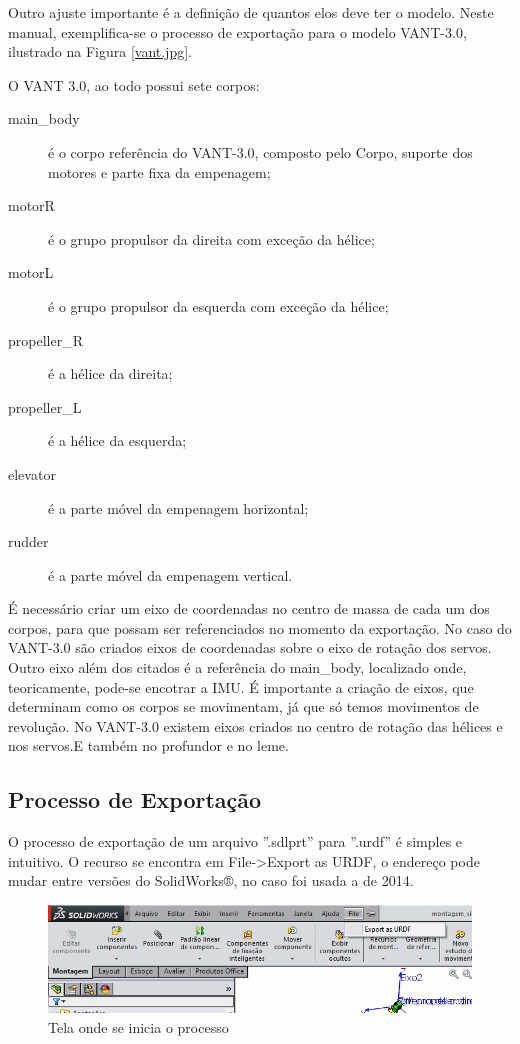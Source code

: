Outro ajuste importante é a definição de quantos elos deve ter o modelo. Neste manual, exemplifica-se o processo de exportação para o modelo VANT-3.0, ilustrado na Figura \ref{vant.jpg}.

O VANT 3.0, ao todo possui sete corpos:


\begin{description}
\item [main\_body] é o corpo referência do VANT-3.0, composto pelo Corpo, suporte dos motores e parte fixa da empenagem;
\item [motorR] é o grupo propulsor da direita com exceção da hélice; 
\item [motorL] é o grupo propulsor da esquerda com exceção da hélice; 
\item [propeller\_R] é a hélice da direita;
\item [propeller\_L] é a hélice da esquerda;
\item [elevator] é a parte móvel da empenagem horizontal;
\item [rudder] é a parte móvel da empenagem vertical.
\end{description}

É necessário criar um eixo de coordenadas no centro de massa de cada um dos corpos, para que possam ser referenciados no momento da exportação. No caso do VANT-3.0 são criados eixos de coordenadas sobre o eixo de rotação dos servos. Outro eixo além dos citados é a referência do main\_body, localizado onde, teoricamente, pode-se encotrar a IMU. É importante a criação de eixos, que determinam como os corpos se movimentam, já que só temos movimentos de revolução. No VANT-3.0 existem eixos criados no centro de rotação das hélices e nos servos.E também no profundor e no leme.

\subsection{Processo de Exportação}

O processo de exportação de um arquivo ''.sdlprt'' para ''.urdf'' é simples e intuitivo. O recurso se encontra em File->Export as URDF, o endereço pode mudar entre versões do SolidWorks®, no caso foi usada a de 2014.

\begin{figure}[!htb]%
\centering %
\includegraphics[scale=0.75]{Imagens/ExportasURDF.JPG} %
\caption{Tela onde se inicia o processo} %
\end{figure} %


